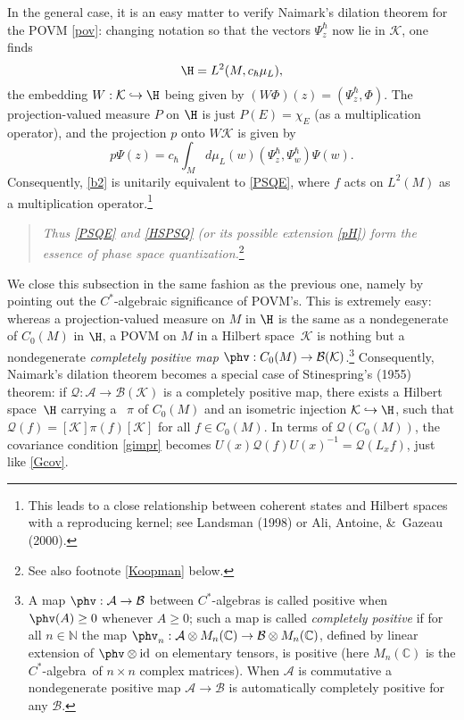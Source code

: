\documentclass[12pt,titlepage]{article}
\newcommand{\beq}{\begin{equation}}
\newcommand{\eeq}{\end{equation}}
\newcommand{\ca}{$C^*$-algebra} \newcommand{\jba}{JB-algebra}
\newcommand{\Hs}{Hilbert space} \newcommand{\Bs}{Banach space}
\newcommand{\id}{\mbox{\rm id}}
\newcommand{\raw}{\rightarrow} \newcommand{\rat}{\mapsto}
\newcommand{\hraw}{\hookrightarrow} \newcommand{\Law}{\Leftarrow}
\newcommand{\x}{\times} \newcommand{\hb}{\hbar}
\newcommand{\inv}{^{-1}} \newcommand{\sa}{_{\R}}
\newcommand{\er}{\eqref}
\newcommand{\ch}{\chi} \newcommand{\ps}{\psi} \newcommand{\Ps}{\Psi}
\newcommand{\CA}{{\mathcal A}} \newcommand{\CB}{{\mathcal B}}
\newcommand{\CK}{{\mathcal K}}   \newcommand{\CL}{{\mathcal L}}
\newcommand{\CQ}{{\mathcal Q}} \newcommand{\CR}{{\mathcal R}}
\newcommand{\C}{{\mathbb C}} \newcommand{\D}{{\mathbb D}}
\newcommand{\N}{{\mathbb N}} \newcommand{\R}{{\mathbb R}}
\begin{document}
 In the general case, it is an easy matter to verify Naimark's dilation theorem for the POVM \er{pov}:
 changing notation so that the vectors $\Psi_z^{\hbar}$ now lie in $\CK$,
 one finds 
 \beq \H=L^2(M, c_{\hbar}\mu_L), \label{HSPSQ}
 \eeq
 the embedding $W:\CK\hraw\H$ being given by $(W\Phi)(z)=(\Psi^{\hbar}_z,\Phi)$. The projection-valued measure $P$ on $\H$ is just $P(E)=\ch_E$ (as a multiplication operator), and the projection $p$ onto $W\CK$ is given by 
 \beq p\Psi(z)=c_{\hbar} \int_M  d\mu_L(w) (\Psi^{\hbar}_{z},\Psi^{\hbar}_{w})\Psi(w).\eeq
 Consequently, \er{b2} is unitarily equivalent
 to \er{PSQE}, where $f$ acts on $L^2(M)$ as a multiplication operator.\footnote{This leads to a close relationship between coherent states and \Hs s with a reproducing kernel; see Landsman (1998) or Ali, Antoine, \&\ Gazeau (2000).}  
\begin{quote}{\it Thus \er{PSQE} and \er{HSPSQ} (or its possible extension \er{pH}) form the essence of phase space quantization.}\footnote{See also footnote  \ref{Koopman} below.}
\end{quote}
  
 We close this subsection in the same fashion as the previous one, namely by pointing out the \ca ic significance of POVM's. This is extremely easy: whereas
 a projection-valued measure on $M$  in $\H$ is the same as a nondegenerate {\it \rep} of $C_0(M)$ in $\H$, a POVM  on $M$  in a \Hs\ $\CK$ is nothing but a nondegenerate {\it completely positive map} $\phv:C_0(M)\raw \mathcal{B}(\CK)$.\footnote{A map  $\phv:\CA\raw\CB$ between \ca s is called positive when $\phv(A)\geq 0$
 whenever $A\geq 0$; such a map is called {\it completely positive} if for all $n\in \N$ the map $\phv_n: \CA\otimes M_n(\C)\raw  \CB\otimes M_n(\C)$, defined by linear extension of $\phv\otimes\id$ on elementary tensors, is positive (here $M_n(\C)$ is the \ca\ of $n\x n$ complex matrices). When $\CA$ is commutative
 a nondegenerate positive map $\CA\raw \CB$ is automatically completely positive for any $\CB$.}
 Consequently, Naimark's dilation theorem becomes a special case of Stinespring's (1955) theorem: if $\CQ:\CA\raw \CB(\CK)$ is a completely positive map,  there exists a \Hs\ $\H$ carrying a \rep\ $\pi$ of $C_0(M)$
 and an isometric injection $\CK\hraw\H$, such that $\CQ(f)=[\CK]\pi(f)[\CK]$ for all $f\in C_0(M)$. In terms of $\CQ(C_0(M))$, the covariance condition
 \er{gimpr} becomes  $U(x)\CQ(f)U(x)\inv=\CQ(L_xf)$, just like 
 \er{Gcov}. 
\end{document}

